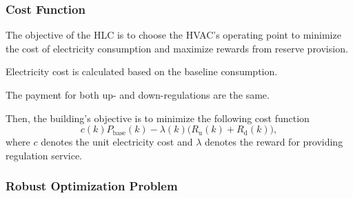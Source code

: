 
\subsubsection{Cost Function}
The objective of the HLC is to choose the HVAC's operating point to minimize the cost of electricity consumption and maximize rewards from reserve provision. 
\begin{assumption}
Electricity cost is calculated based on the baseline consumption.
\end{assumption}
\begin{assumption}
The payment for both up- and down-regulations are the same.
\end{assumption}
Then, the building's objective is to minimize the following cost function
\begin{equation}\label{eq:cost_function}
c(k) P_{\text{base}}(k) - \lambda(k) \big(R_{\text{u}}(k) + R_{\text{d}}(k)\big),
\end{equation}
where $c$ denotes the unit electricity cost and $\lambda$ denotes the reward for providing regulation service.


\subsubsection{Robust Optimization Problem}

